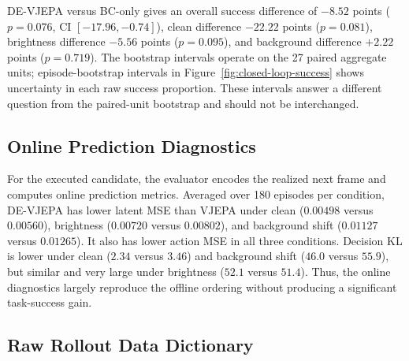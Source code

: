 \documentclass[10pt,twocolumn]{article}
\theoremstyle{tightstyle}
\begin{document}
DE-VJEPA versus BC-only gives an overall success difference of $-8.52$ points
($p=0.076$, CI $[-17.96,-0.74]$), clean difference $-22.22$ points
($p=0.081$), brightness difference $-5.56$ points ($p=0.095$), and background
difference $+2.22$ points ($p=0.719$). The bootstrap intervals operate on the
27 paired aggregate units; episode-bootstrap intervals in
Figure~\ref{fig:closed-loop-success} shows uncertainty in each raw success
proportion. These intervals answer a different question from the paired-unit
bootstrap and should not be interchanged.

\subsection{Online Prediction Diagnostics}

For the executed candidate, the evaluator encodes the realized next frame and
computes online prediction metrics. Averaged over 180 episodes per condition,
DE-VJEPA has lower latent MSE than VJEPA under clean
($0.00498$ versus $0.00560$), brightness ($0.00720$ versus $0.00802$), and
background shift ($0.01127$ versus $0.01265$). It also has lower action MSE in
all three conditions. Decision KL is lower under clean
($2.34$ versus $3.46$) and background shift ($46.0$ versus $55.9$), but similar
and very large under brightness ($52.1$ versus $51.4$). Thus, the online
diagnostics largely reproduce the offline ordering without producing a
significant task-success gain.

\subsection{Raw Rollout Data Dictionary}
\end{document}
